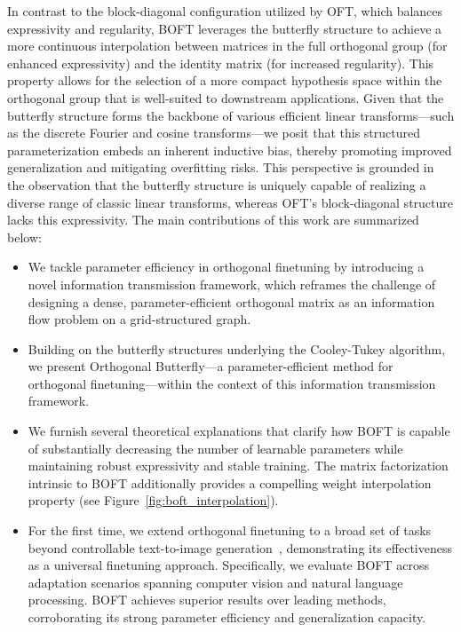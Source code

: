 In contrast to the block-diagonal configuration utilized by OFT, which balances expressivity and regularity, BOFT leverages the butterfly structure to achieve a more continuous interpolation between matrices in the full orthogonal group (for enhanced expressivity) and the identity matrix (for increased regularity). This property allows for the selection of a more compact hypothesis space within the orthogonal group that is well-suited to downstream applications. Given that the butterfly structure forms the backbone of various efficient linear transforms—such as the discrete Fourier and cosine transforms—we posit that this structured parameterization embeds an inherent inductive bias, thereby promoting improved generalization and mitigating overfitting risks. This perspective is grounded in the observation that the butterfly structure is uniquely capable of realizing a diverse range of classic linear transforms, whereas OFT's block-diagonal structure lacks this expressivity. The main contributions of this work are summarized below:

\begin{itemize}[leftmargin=*,nosep]
    \item We tackle parameter efficiency in orthogonal finetuning by introducing a novel information transmission framework, which reframes the challenge of designing a dense, parameter-efficient orthogonal matrix as an information flow problem on a grid-structured graph.
    \item Building on the butterfly structures underlying the Cooley-Tukey algorithm, we present Orthogonal Butterfly—a parameter-efficient method for orthogonal finetuning—within the context of this information transmission framework.
    \item We furnish several theoretical explanations that clarify how BOFT is capable of substantially decreasing the number of learnable parameters while maintaining robust expressivity and stable training. The matrix factorization intrinsic to BOFT additionally provides a compelling weight interpolation property (see Figure~\ref{fig:boft_interpolation}).
    \item For the first time, we extend orthogonal finetuning to a broad set of tasks beyond controllable text-to-image generation~\cite{qiu2023controlling}, demonstrating its effectiveness as a universal finetuning approach. Specifically, we evaluate BOFT across adaptation scenarios spanning computer vision and natural language processing. BOFT achieves superior results over leading methods, corroborating its strong parameter efficiency and generalization capacity.
\end{itemize}

